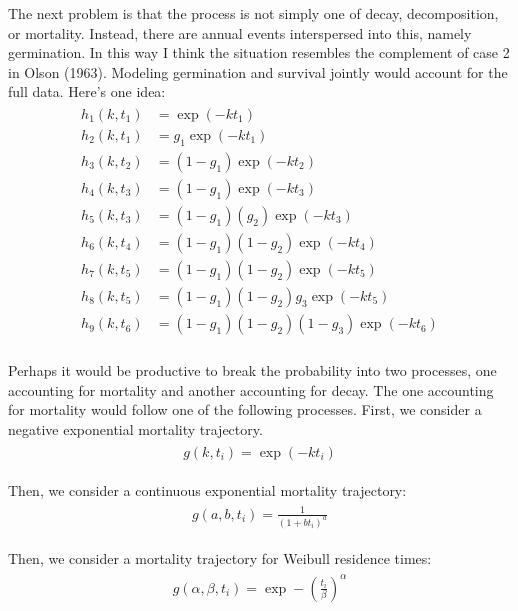 \documentclass[12pt, oneside, titlepage]{article}   	%
\begin{document}
The next problem is that the process is not simply one of decay, decomposition, or mortality. Instead, there are annual events interspersed into this, namely germination. In this way I think the situation resembles the complement of case 2 in Olson (1963). Modeling germination and survival jointly would account for the full data. Here's one idea:
%
\begin{align}
  \begin{split}
h_1(k,t_1) & = \exp(-k t_1) \\
h_2(k,t_1) & = g_1  \exp(-k t_1) \\
h_3(k,t_2) & = (1-g_1)  \exp(-k t_2) \\
h_4(k,t_3) & = (1-g_1)  \exp(-k t_3) \\
h_5(k,t_3) & = (1-g_1) (g_2)  \exp(-k t_3) \\
h_6(k,t_4) & = (1-g_1) (1-g_2)  \exp(-k t_4) \\
h_7(k,t_5) & = (1-g_1) (1-g_2)  \exp(-k t_5) \\
h_8(k,t_5) & = (1-g_1) (1-g_2) g_3 \exp(-k t_5) \\
h_9(k,t_6) & = (1-g_1) (1-g_2) (1-g_3) \exp(-k t_6) \\
  \end{split}
\end{align}
%

Perhaps it would be productive to break the probability into two processes, one accounting for mortality and another accounting for decay. The one accounting for mortality would follow one of the following processes. First, we consider a negative exponential mortality trajectory.
%
\begin{align}
  \begin{split}
g(k,t_i) = \exp(-k t_i)
  \end{split}
\end{align}

Then, we consider a continuous exponential mortality trajectory:
%
\begin{align}
  \begin{split}
g(a,b,t_i) = \frac{1}{(1+bt_i)^a}
  \end{split}
\end{align}
% 

Then, we consider a mortality trajectory for Weibull residence times:
%
\begin{align}
  \begin{split}
g(\alpha,\beta,t_i) = \exp-(\frac{t_i}{\beta})^\alpha
  \end{split}
\end{align}
\end{document}
